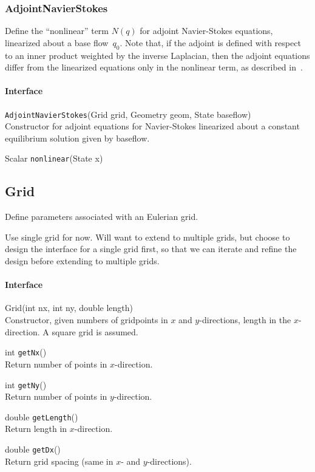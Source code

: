\documentclass[11pt]{article}
\def\fn#1{{\tt #1}} %
\begin{document}
\subsubsection{AdjointNavierStokes}
Define the ``nonlinear'' term $N(q)$ for adjoint Navier-Stokes equations, linearized about a base flow~$q_0$.  Note that, if the adjoint is defined with respect to an inner product weighted by the inverse Laplacian, then the adjoint equations differ from the linearized equations only in the nonlinear term, as described in~\cite{AhuRow-08}.

\paragraph{Interface}
\begin{description}
	\item \fn{AdjointNavierStokes}(Grid grid, Geometry geom, State baseflow)\\
		Constructor for adjoint equations for Navier-Stokes linearized about a constant equilibrium solution given by baseflow.
	\item Scalar \fn{nonlinear}(State x)
\end{description}

\subsection{Grid}
Define parameters associated with an Eulerian grid.

Use single grid for now.  Will want to extend to multiple grids, but choose to design the interface for a single grid first, so that we can iterate and refine the design before extending to multiple grids.

\paragraph{Interface}
\begin{description}
	\item Grid(int nx, int ny, double length)\\
		Constructor, given numbers of gridpoints in $x$ and $y$-directions, length in the $x$-direction.  A square grid is assumed.
	\item int \fn{getNx}()\\
		Return number of points in $x$-direction.
	\item int \fn{getNy}()\\
		Return number of points in $y$-direction.
	\item double \fn{getLength}()\\
		Return length in $x$-direction.
	\item double \fn{getDx}()\\
		Return grid spacing (same in $x$- and $y$-directions).
		
\end{description}
\end{document}
